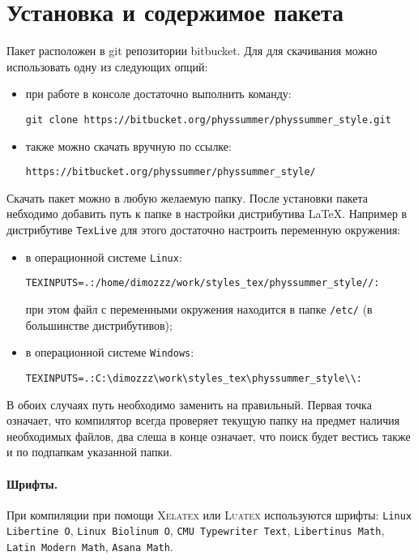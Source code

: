 \section{Установка и содержимое пакета}

Пакет расположен в git репозитории bitbucket. Для для скачивания можно использовать одну из следующих
опций:
\begin{itemize}
    \item при работе в консоле достаточно выполнить команду:
        \begin{lstlisting}[gobble = 7, keepspaces = \false]
            git clone https://bitbucket.org/physsummer/physsummer_style.git
        \end{lstlisting}
    \item также можно скачать вручную по ссылке:
        \begin{lstlisting}[gobble = 7, keepspaces = \false]
            https://bitbucket.org/physsummer/physsummer_style/
        \end{lstlisting}
\end{itemize}


Скачать пакет можно в любую желаемую папку. После установки пакета небходимо добавить путь к папке в
настройки дистрибутива \LaTeX. Например в дистрибутиве \texttt{TexLive} для этого достаточно настроить
переменную окружения:

\begin{itemize}
    \item в операционной системе \texttt{Linux}:
        \begin{lstlisting}[gobble = 7, keepspaces = \false]
            TEXINPUTS=.:/home/dimozzz/work/styles_tex/physsummer_style//:
        \end{lstlisting}
        при этом файл с переменными окружения находится в папке \texttt{/etc/} (в большинстве дистрибутивов);
    \item в операционной системе \texttt{Windows}:
        \begin{lstlisting}[gobble = 7, keepspaces = \false]
            TEXINPUTS=.:C:\dimozzz\work\styles_tex\physsummer_style\\:
        \end{lstlisting}
\end{itemize}

В обоих случаях путь необходимо заменить на правильный. Первая точка означает, что компилятор всегда
проверяет текущую папку на предмет наличия необходимых файлов, два слеша в конце означает, что поиск
будет вестись также и по подпапкам указанной папки.

\paragraph{Шрифты.} При компиляции при помощи \textsc{Xelatex} или \textsc{Luatex} используются шрифты:
\texttt{Linux Libertine O}, \texttt{Linux Biolinum O}, \texttt{CMU Typewriter Text},
\texttt{Libertinus Math}, \texttt{Latin Modern Math}, \texttt{Asana Math}.